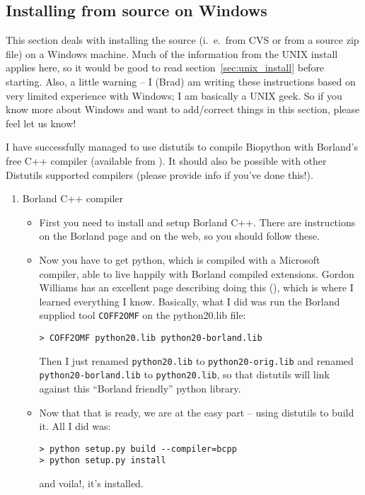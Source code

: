 \documentclass{article}
\begin{document}
\subsection{Installing from source on Windows}
\label{sec:windows_install}

This section deals with installing the source (i.~e.~from CVS or from a source zip file) on a Windows machine. Much of the information from the UNIX install applies here, so it would be good to read section~\ref{sec:unix_install} before starting. Also, a little warning -- I (Brad) am writing these instructions based on very limited experience with Windows; I am basically a UNIX geek. So if you know more about Windows and want to add/correct things in this section, please feel let us know!

I have successfully managed to use distutils to compile Biopython with Borland's free C++ compiler (available from ). It should also be possible with other Distutils supported compilers (please provide info if you've done this!).

\begin{enumerate}
  \item Borland C++ compiler

\begin{itemize}
  \item First you need to install and setup Borland C++. There are instructions on the Borland page and on the web, so you should follow these.
 
  \item Now you have to get python, which is compiled with a Microsoft compiler, able to live happily with Borland compiled extensions. Gordon Williams has an excellent page describing doing this (), which is where I learned everything I know. Basically, what I did was run the Borland supplied tool \verb|COFF2OMF| on the python20.lib file:

\begin{verbatim}
> COFF2OMF python20.lib python20-borland.lib
\end{verbatim}

Then I just renamed \verb|python20.lib| to \verb|python20-orig.lib| and renamed \verb|python20-borland.lib| to \verb|python20.lib|, so that distutils will link against this ``Borland friendly'' python library.

  \item Now that that is ready, we are at the easy part -- using distutils to build it. All I did was:

\begin{verbatim}
> python setup.py build --compiler=bcpp
> python setup.py install
\end{verbatim}

and voila!, it's installed. 

\end{itemize}

\end{enumerate}
\end{document}
